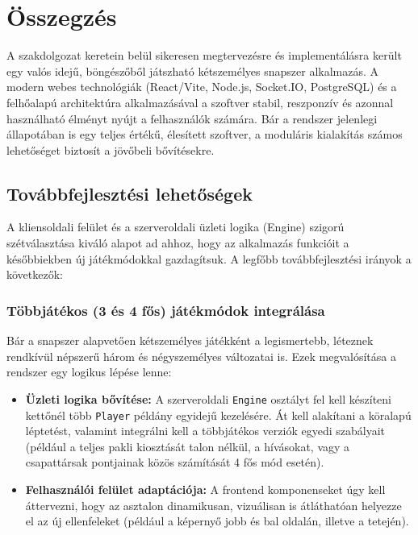 \chapter{Összegzés}
\label{ch:sum}

A szakdolgozat keretein belül sikeresen megtervezésre és implementálásra került egy valós idejű, böngészőből játszható kétszemélyes snapszer alkalmazás. A modern webes technológiák (React/Vite, Node.js, Socket.IO, PostgreSQL) és a felhőalapú architektúra alkalmazásával a szoftver stabil, reszponzív és azonnal használható élményt nyújt a felhasználók számára. Bár a rendszer jelenlegi állapotában is egy teljes értékű, élesített szoftver, a moduláris kialakítás számos lehetőséget biztosít a jövőbeli bővítésekre.

\section{Továbbfejlesztési lehetőségek}
\label{sec:future_work}

A kliensoldali felület és a szerveroldali üzleti logika (Engine) szigorú szétválasztása kiváló alapot ad ahhoz, hogy az alkalmazás funkcióit a későbbiekben új játékmódokkal gazdagítsuk. A legfőbb továbbfejlesztési irányok a következők:

\subsection{Többjátékos (3 és 4 fős) játékmódok integrálása}
Bár a snapszer alapvetően kétszemélyes játékként a legismertebb, léteznek rendkívül népszerű három és négyszemélyes változatai is. Ezek megvalósítása a rendszer egy logikus lépése lenne:
\begin{itemize}
    \item \textbf{Üzleti logika bővítése:} A szerveroldali \texttt{Engine} osztályt fel kell készíteni kettőnél több \texttt{Player} példány egyidejű kezelésére. Át kell alakítani a köralapú léptetést, valamint integrálni kell a többjátékos verziók egyedi szabályait (például a teljes pakli kiosztását talon nélkül, a hívásokat, vagy a csapattársak pontjainak közös számítását 4 fős mód esetén).
    \item \textbf{Felhasználói felület adaptációja:} A frontend komponenseket úgy kell áttervezni, hogy az asztalon dinamikusan, vizuálisan is átláthatóan helyezze el az új ellenfeleket (például a képernyő jobb és bal oldalán, illetve a tetején).
\end{itemize}

